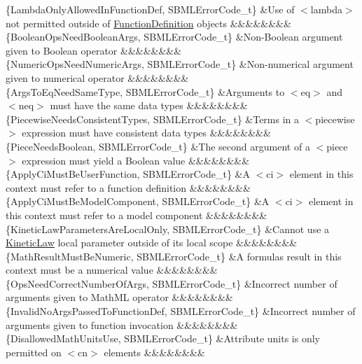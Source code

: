 \begin{DoxyParagraph}{}
\begin{longtabu}
\{Lambda\+Only\+Allowed\+In\+Function\+Def, S\+B\+M\+L\+Error\+Code\+\_\+t\} &Use of {\ttfamily $<$lambda$>$} not permitted outside of \hyperlink{class_function_definition}{Function\+Definition} objects &&&&&&&&\\
\{Boolean\+Ops\+Need\+Boolean\+Args, S\+B\+M\+L\+Error\+Code\+\_\+t\} &Non-\/\+Boolean argument given to Boolean operator &&&&&&&&\\
\{Numeric\+Ops\+Need\+Numeric\+Args, S\+B\+M\+L\+Error\+Code\+\_\+t\} &Non-\/numerical argument given to numerical operator &&&&&&&&\\
\{Args\+To\+Eq\+Need\+Same\+Type, S\+B\+M\+L\+Error\+Code\+\_\+t\} &Arguments to {\ttfamily $<$eq$>$} and {\ttfamily $<$neq$>$} must have the same data types &&&&&&&&\\
\{Piecewise\+Needs\+Consistent\+Types, S\+B\+M\+L\+Error\+Code\+\_\+t\} &Terms in a {\ttfamily $<$piecewise$>$} expression must have consistent data types &&&&&&&&\\
\{Piece\+Needs\+Boolean, S\+B\+M\+L\+Error\+Code\+\_\+t\} &The second argument of a {\ttfamily $<$piece$>$} expression must yield a Boolean value &&&&&&&&\\
\{Apply\+Ci\+Must\+Be\+User\+Function, S\+B\+M\+L\+Error\+Code\+\_\+t\} &A {\ttfamily $<$ci$>$} element in this context must refer to a function definition &&&&&&&&\\
\{Apply\+Ci\+Must\+Be\+Model\+Component, S\+B\+M\+L\+Error\+Code\+\_\+t\} &A {\ttfamily $<$ci$>$} element in this context must refer to a model component &&&&&&&&\\
\{Kinetic\+Law\+Parameters\+Are\+Local\+Only, S\+B\+M\+L\+Error\+Code\+\_\+t\} &Cannot use a \hyperlink{class_kinetic_law}{Kinetic\+Law} local parameter outside of its local scope &&&&&&&&\\
\{Math\+Result\+Must\+Be\+Numeric, S\+B\+M\+L\+Error\+Code\+\_\+t\} &A formula\textquotesingle{}s result in this context must be a numerical value &&&&&&&&\\
\{Ops\+Need\+Correct\+Number\+Of\+Args, S\+B\+M\+L\+Error\+Code\+\_\+t\} &Incorrect number of arguments given to Math\+ML operator &&&&&&&&\\
\{Invalid\+No\+Args\+Passed\+To\+Function\+Def, S\+B\+M\+L\+Error\+Code\+\_\+t\} &Incorrect number of arguments given to function invocation &&&&&&&&\\
\{Disallowed\+Math\+Units\+Use, S\+B\+M\+L\+Error\+Code\+\_\+t\} &Attribute \textquotesingle{}units\textquotesingle{} is only permitted on {\ttfamily $<$cn$>$} elements &&&&&&&&\\

\end{longtabu}
\end{DoxyParagraph}
